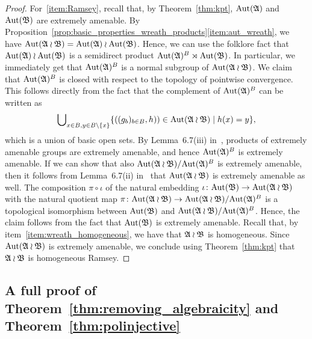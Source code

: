 \begin{proof}
For~\eqref{item:Ramsey}, recall that, by Theorem~\ref{thm:kpt}, $\mathrm{Aut}(\mathfrak{A})$ and $\mathrm{Aut}(\mathfrak{B})$ are extremely amenable. 
%
By Proposition~\ref{prop:basic_properties_wreath_products}\eqref{item:aut_wreath}, we have $\mathrm{Aut}(\mathfrak{A} \wr \mathfrak{B})=\mathrm{Aut}(\mathfrak{A}) \wr \mathrm{Aut}(\mathfrak{B})$.
%
Hence, we can use the folklore fact that $  \mathrm{Aut}(\mathfrak{A}) \wr \mathrm{Aut}(\mathfrak{B})$ is a semidirect product $\mathrm{Aut}(\mathfrak{A})^B \rtimes \mathrm{Aut}(\mathfrak{B})$.
%
In particular, we immediately get that $ \mathrm{Aut}(\mathfrak{A})^B$ is a normal subgroup of $\mathrm{Aut}(\mathfrak{A} \wr \mathfrak{B})$.
% 
We claim that $\mathrm{Aut}(\mathfrak{A})^B$ is closed with respect to the topology of pointwise convergence.
%
This follows directly from the fact that the complement of $\mathrm{Aut}(\mathfrak{A})^B$ can be written as \[\bigcup\nolimits_{x \in B, y\in B\setminus\{x\}}\{\left((g_b)_{b\in B},h)\right)\in \mathrm{Aut}(\mathfrak{A}\wr \mathfrak{B}) \mid h(x)=y \},\] which is a union of basic open sets.
%
By Lemma~6.7(iii) in~\cite{kechris2005fraisse}, products of extremely amenable groups are extremely amenable, and hence $\mathrm{Aut}(\mathfrak{A})^B$ is extremely amenable.
%
If we can show that also $\mathrm{Aut}(\mathfrak{A} \wr \mathfrak{B})/\mathrm{Aut}(\mathfrak{A})^B$ is extremely amenable, then it follows from Lemma~6.7(ii) in~\cite{kechris2005fraisse} that $\mathrm{Aut}(\mathfrak{A} \wr \mathfrak{B})$ is extremely amenable as well.
% 
The composition $\pi \circ \iota$ of the natural embedding $\iota \colon \mathrm{Aut}(\mathfrak{B})\rightarrow \mathrm{Aut}(\mathfrak{A} \wr \mathfrak{B})$ with the natural quotient map $\pi \colon \mathrm{Aut}(\mathfrak{A} \wr \mathfrak{B}) \rightarrow \mathrm{Aut}(\mathfrak{A} \wr \mathfrak{B})/\mathrm{Aut}(\mathfrak{A})^B$ is a topological isomorphism between $\mathrm{Aut}(\mathfrak{B})$ and $\mathrm{Aut}(\mathfrak{A} \wr \mathfrak{B})/\mathrm{Aut}(\mathfrak{A})^B$. 
%
Hence, the claim follows from the fact that $\mathrm{Aut}(\mathfrak{B})$ is extremely amenable.
%
Recall that, by item~\ref{item:wreath_homogeneous}, we have that $\mathfrak{A} \wr \mathfrak{B}$ is homogeneous.
%
Since $\mathrm{Aut}(\mathfrak{A} \wr \mathfrak{B})$ is extremely amenable, we conclude using Theorem~\ref{thm:kpt} that $\mathfrak{A} \wr \mathfrak{B}$ is homogeneous Ramsey.  
\end{proof} 

\subsection{A full proof of Theorem~\ref{thm:removing_algebraicity} and Theorem~\ref{thm:polinjective}}

\maintheorem*
 
\maintheoremtwo*
 
